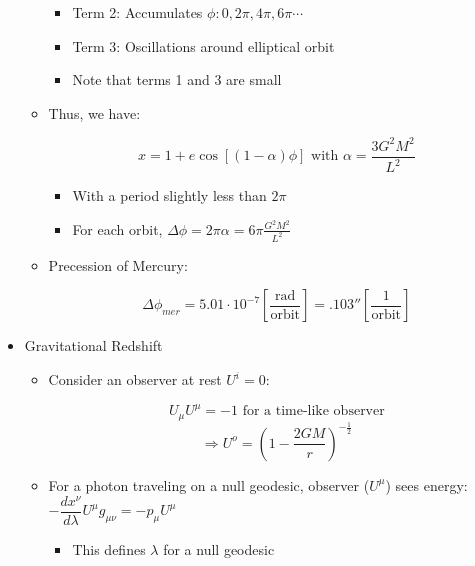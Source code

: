 \begin{itemize}
\begin{itemize}
\begin{itemize}
          \item Term 2: Accumulates $\phi:0,2\pi,4\pi,6\pi\cdots$

          \item Term 3: Oscillations around elliptical orbit

          \item Note that terms 1 and 3 are small

        \end{itemize}

      \item Thus, we have:

        $$x=1+e\cos\left[ (1-\alpha)\phi \right]\text{ with }\alpha=\frac{3G^2M^2}{L^2}$$

        \begin{itemize}

          \item With a period slightly less than $2\pi$

          \item For each orbit, $\Delta \phi=2\pi\alpha=6\pi\frac{G^2M^2}{L^2}$

        \end{itemize}

      \item Precession of Mercury:

        $$\Delta\phi_{mer}=5.01\cdot10^{-7}\left[ \frac{\text{rad}}{\text{orbit}} \right]=.103''\left[ \frac{1}{\text{orbit}} \right]$$

    \end{itemize}

  \item Gravitational Redshift

    \begin{itemize}

      \item Consider an observer at rest $U^i=0$:

        $$U_{\mu}U^{\mu}=-1\text{ for a time-like observer}$$
        $$\Rightarrow U^{o}=\left( 1-\frac{2GM}{r} \right)^{-\frac{1}{2}}$$

      \item For a photon traveling on a null geodesic, observer ($U^{\mu}$) sees energy: $-\dfrac{dx^{\nu}}{d\lambda}U^{\mu}g_{\mu\nu}=-p_{\mu}U^{\mu}$

        \begin{itemize}

          \item This defines $\lambda$ for a null geodesic


\end{itemize}
\end{itemize}
\end{itemize}
